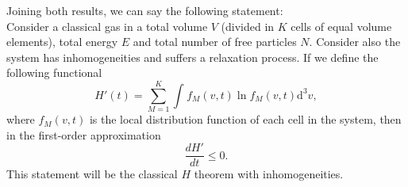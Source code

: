 \documentclass{article}
\begin{document}
Joining both results, we can say the following statement:\\
Consider a classical gas in a total volume $V$ (divided in $K$ cells of equal volume elements), total energy $E$ and total number of free particles $N$. Consider also the system has inhomogeneities and suffers a relaxation process. If we define the following functional
\begin{equation}
   H'(t)=\sum_{M=1}^{K}\int_{}^{} f_M(v,t) \ln f_M(v,t)\mathrm{d}^3v  \label{CH3},
\end{equation}
where $f_M(v,t)$ is the local distribution function of each cell in the system, then in the first-order approximation
\begin{equation}
    \frac{dH'}{dt} \leq 0.
\end{equation}
This statement will be the classical $H$ theorem with inhomogeneities.
\\


\end{document}
